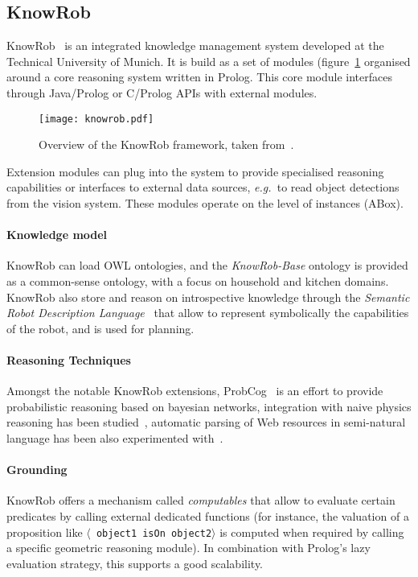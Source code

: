 \documentclass{IEEEtran}
\newcommand{\eg}{{\textit{e.g.\ }}}
\newcommand{\stmt}[1]{{\footnotesize \tt $\langle$ #1\relax$\rangle$}}
\begin{document}
\subsection{KnowRob}
\label{sect|knowrob}


{\sc KnowRob}~\cite{Tenorth2009a} is an integrated knowledge management system
developed at the Technical University of Munich. It is build as a set of
modules (figure~\ref{fig|knowrob} organised around a core reasoning system
written in Prolog. This core module interfaces through Java/Prolog or
C/Prolog APIs with external modules.

\begin{figure}
    \centering
    \texttt{[image: knowrob.pdf]}

    \caption{Overview of the {\sc KnowRob} framework, taken
    from~\cite{Tenorth2011}.}

    \label{fig|knowrob}
\end{figure}

Extension modules can plug into the system to provide specialised reasoning
capabilities or interfaces to external data sources, \eg to read object
detections from the vision system. These modules operate on the level of
instances (ABox).

\paragraph{Knowledge model} {\sc KnowRob} can load OWL ontologies, and the
\emph{KnowRob-Base} ontology is provided as a common-sense ontology, with a
focus on household and kitchen domains. {\sc KnowRob} also store and reason on
introspective knowledge through the \emph{Semantic Robot Description
Language}~\cite{Kunze2011} that allow to represent symbolically the
capabilities of the robot, and is used for planning.


\paragraph{Reasoning Techniques} Amongst the notable {\sc KnowRob} extensions,
{\sc ProbCog}~\cite{Jain2009} is an effort to provide probabilistic reasoning
based on bayesian networks, integration with naive physics reasoning has been
studied~\cite{Kunze2011a}, automatic parsing of Web resources in semi-natural
language has been also experimented with~\cite{Nyga2009}.

\paragraph{Grounding} {\sc KnowRob} offers a mechanism called \emph{computables} that allow to
evaluate certain predicates by calling external dedicated functions (for
instance, the valuation of a proposition like \stmt{object1 isOn object2} is
computed when required by calling a specific geometric reasoning module). In
combination with Prolog's lazy evaluation strategy, this supports a good
scalability.
\end{document}

